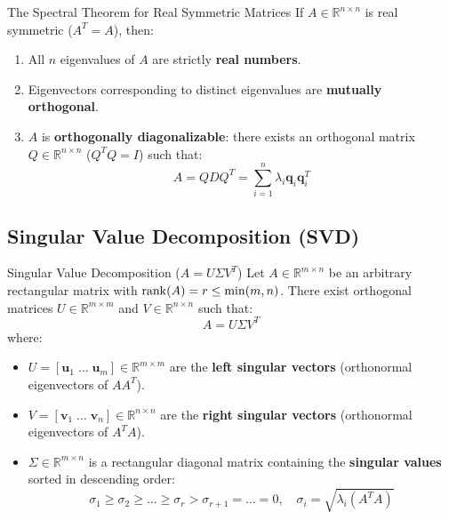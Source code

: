 \begin{theorembox}{The Spectral Theorem for Real Symmetric Matrices}
If $A \in \mathbb{R}^{n \times n}$ is real symmetric ($A^T = A$), then:
\begin{enumerate}
    \item All $n$ eigenvalues of $A$ are strictly \textbf{real numbers}.
    \item Eigenvectors corresponding to distinct eigenvalues are \textbf{mutually orthogonal}.
    \item $A$ is \textbf{orthogonally diagonalizable}: there exists an orthogonal matrix $Q \in \mathbb{R}^{n \times n}$ ($Q^T Q = I$) such that:
    \begin{equation}
    A = Q D Q^T = \sum_{i=1}^n \lambda_i \mathbf{q}_i \mathbf{q}_i^T
    \end{equation}
\end{enumerate}
\end{theorembox}

\subsection{Singular Value Decomposition (SVD)}

\begin{definitionbox}{Singular Value Decomposition ($A = U \Sigma V^T$)}
Let $A \in \mathbb{R}^{m \times n}$ be an arbitrary rectangular matrix with $\operatorname{rank}(A) = r \le \min(m, n)$. There exist orthogonal matrices $U \in \mathbb{R}^{m \times m}$ and $V \in \mathbb{R}^{n \times n}$ such that:
\begin{equation}
A = U \Sigma V^T
\end{equation}
where:
\begin{itemize}
    \item $U = [\mathbf{u}_1 \; \dots \; \mathbf{u}_m] \in \mathbb{R}^{m \times m}$ are the \textbf{left singular vectors} (orthonormal eigenvectors of $A A^T$).
    \item $V = [\mathbf{v}_1 \; \dots \; \mathbf{v}_n] \in \mathbb{R}^{n \times n}$ are the \textbf{right singular vectors} (orthonormal eigenvectors of $A^T A$).
    \item $\Sigma \in \mathbb{R}^{m \times n}$ is a rectangular diagonal matrix containing the \textbf{singular values} sorted in descending order:
    \begin{equation}
    \sigma_1 \ge \sigma_2 \ge \dots \ge \sigma_r > \sigma_{r+1} = \dots = 0, \quad \sigma_i = \sqrt{\lambda_i(A^T A)}
    \end{equation}
\end{itemize}
\end{definitionbox}

